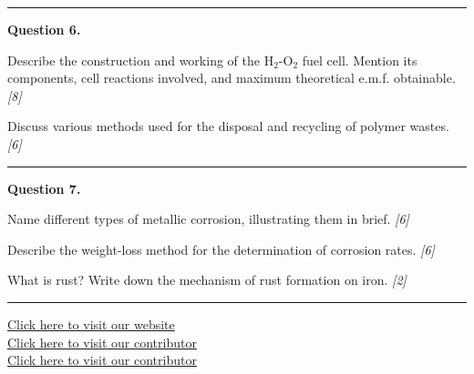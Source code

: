 \documentclass[11pt,a4paper]{article}
\newcommand{\pts}[1]{\hfill   \textit{[#1]}}
\begin{document}
\medskip\rule{\linewidth}{0.2pt}




\noindent   \textbf{Question 6.}

\begin{parts}
  \item Describe the construction and working of the $ \text{H}_2 \text{-O}_2$ fuel cell. Mention its components, cell reactions involved, and maximum theoretical e.m.f. obtainable. \pts{8}
  \item Discuss various methods used for the disposal and recycling of polymer wastes. \pts{6}
\end{parts}

\medskip\rule{\linewidth}{0.2pt}




\noindent   \textbf{Question 7.}

\begin{parts}
  \item Name different types of metallic corrosion, illustrating them in brief. \pts{6}
  \item Describe the weight-loss method for the determination of corrosion rates. \pts{6}
  \item What is rust? Write down the mechanism of rust formation on iron. \pts{2}
\end{parts}

\vfill
\rule{\linewidth}{0.4pt}

\begin{center}\small
  \href{https://bhu-exam.vercel.app/}{Click here to visit our website}\\[4pt]
  \href{https://me-aryan.vercel.app/}{Click here to visit our contributor}\\[4pt]
  \href{https://quashan-me.vercel.app/}{Click here to visit our contributor}
\end{center}
\end{document}
